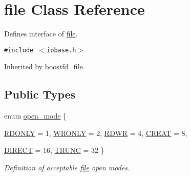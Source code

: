 \hypertarget{classfile}{
\section{file Class Reference}
\label{classfile}
}
Defines interface of \hyperlink{classfile}{file}.  


{\tt \#include $<$iobase.h$>$}

Inherited by boostfd\_\-file.

\subsection*{Public Types}
\begin{CompactItemize}
\item 
enum \hyperlink{group__iolayer_ge71b15e0014e7ce4dc13c8f83aa97582}{open\_\-mode} \{ \par
\hyperlink{group__iolayer_gge71b15e0014e7ce4dc13c8f83aa97582ac58f1566e053cf5f8ee9dcb5f97b82b}{RDONLY} =  1, 
\hyperlink{group__iolayer_gge71b15e0014e7ce4dc13c8f83aa97582de40e8cbe66eb259ed5378c7d13b4f69}{WRONLY} =  2, 
\hyperlink{group__iolayer_gge71b15e0014e7ce4dc13c8f83aa97582afcab766b3f436a66049b850ef7efb5c}{RDWR} =  4, 
\hyperlink{group__iolayer_gge71b15e0014e7ce4dc13c8f83aa97582971314bb8ab4fa48a078a4164c704edd}{CREAT} =  8, 
\par
\hyperlink{group__iolayer_gge71b15e0014e7ce4dc13c8f83aa97582e1e222042131ddbb85b2bd3fc0f80653}{DIRECT} =  16, 
\hyperlink{group__iolayer_gge71b15e0014e7ce4dc13c8f83aa975828842a94419a50b809fdead40a130785d}{TRUNC} =  32
 \}
\begin{CompactList}\small\item\em Definition of acceptable \hyperlink{classfile}{file} open modes. \item\end{CompactList}\end{CompactItemize}

